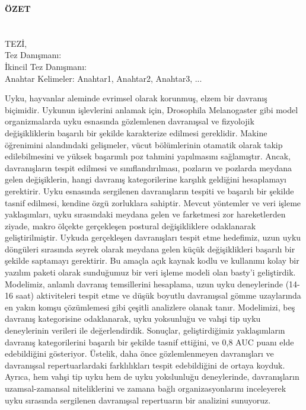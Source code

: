 \clearpage\pagebreak
\begin{center}
	\MakeUppercase{\textbf{Özet}} \\ [3\baselineskip]
	\MakeUppercase{\thesistitletr} \\ [3\baselineskip]
	\MakeUppercase{\student} \\[\baselineskip]
	\MakeUppercase{\majortr \degreetr Tez\.{ı}, \monthtr~\year} \\[\baselineskip]
	Tez Danışmanı: \advisortr \\
	İkincil Tez Danışmanı: \coadvisortr \\
	[2\baselineskip]
	Anahtar Kelimeler: Anahtar1, Anahtar2, Anahtar3, ... \\[2\baselineskip]
\end{center}

\singlespacing

Uyku, hayvanlar aleminde evrimsel olarak korunmuş, elzem bir davranış biçimidir.
Uykunun işlevlerini anlamak için, Drosophila Melanogaster gibi model organizmalarda uyku esnasında gözlemlenen davranışsal ve fizyolojik değişikliklerin başarılı bir şekilde karakterize edilmesi gereklidir.
Makine öğrenimini alandındaki gelişmeler, vücut bölümlerinin otamatik olarak takip edilebilmesini ve yüksek başarımlı poz tahmini yapılmasını sağlamıştır.
Ancak, davranışların tespit edilmesi ve sınıflandırılması, pozların ve pozlarda meydana gelen değişiklerin, hangi davranış kategorilerine karşılık geldiğini hesaplamayı gerektirir.
Uyku esnasında sergilenen davranı\c{s}ların tespiti ve başarılı bir şekilde tasnif edilmesi, kendine özgü zorluklara sahiptir.
Mevcut yöntemler ve veri işleme yaklaşımları, uyku sırasındaki meydana gelen ve farketmesi zor hareketlerden ziyade, makro ölçekte gerçekleşen postural değişikliklere odaklanarak geliştirilmiştir.
Uykuda gerçekleşen davranışları tespit etme hedefimiz, uzun uyku döngüleri sırasında seyrek olarak meydana gelen küçük değişiklikleri başarılı bir şekilde saptamayı gerektirir.
Bu amaçla açık kaynak kodlu ve kullanımı kolay bir yazılım paketi olarak sunduğumuz bir veri işleme modeli olan basty’i geliştirdik.
Modelimiz, anlamlı davranış temsillerini hesaplama, uzun uyku deneylerinde (14-16 saat) aktiviteleri tespit etme ve düşük boyutlu davranışsal gömme uzaylarında en yakın komşu çözümlemesi gibi çeşitli analizlere olanak tanır.
Modelimizi, beş davranış kategorisine odaklanarak, uyku yoksunluğu ve vahşi tip uyku deneylerinin verileri ile değerlendirdik.
Sonuçlar, geliştirdiğimiz yaklaşımların davranış kategorilerini başarılı bir şekilde tasnif ettiğini, ve 0,8 AUC puanı elde edebildiğini gösteriyor.
Üstelik, daha önce gözlemlenmeyen davranışları ve davranışsal repertuarlardaki farklılıkları tespit edebildiğini de ortaya koyduk.
Ayrıca, hem vahşi tip uyku hem de uyku yokslunluğu deneylerinde, davranışların uzamsal-zamansal niteliklerini ve zamana bağlı organizasyonlarını inceleyerek uyku sırasında sergilenen davranışsal repertuarın bir analizini sunuyoruz.

\onehalfspacing
